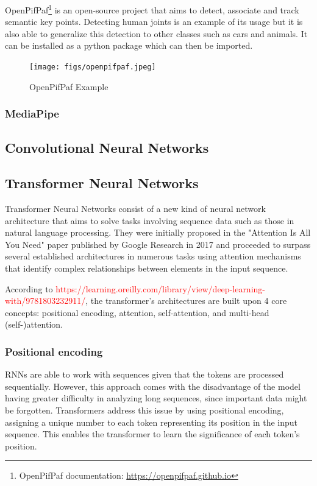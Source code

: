 OpenPifPaf\cite{Kreiss2021,Kreiss2019}\footnote{OpenPifPaf documentation: \url{https://openpifpaf.github.io}} is an open-source project that aims to detect, associate and track semantic key points. Detecting human joints is an example of its usage but it is also able to generalize this detection to other classes such as cars and animals. It can be installed as a python package which can then be imported.

\begin{figure}[h]
\centerline{\texttt{[image: figs/openpifpaf.jpeg]}}
\caption[OpenPifPaf Example]{OpenPifPaf Example \cite{Kreiss2021}}
\label{openpifpaf}
\end{figure}

\subsubsection{MediaPipe}

\subsection{Convolutional Neural Networks}

\subsection{Transformer Neural Networks}
\label{subsection:transformer_neural_networks}

Transformer Neural Networks consist of a new kind of neural network architecture that aims to solve tasks involving sequence data such as those in natural language processing. They were initially proposed in the "Attention Is All You Need" paper published by Google Research in 2017\cite{Vaswani2017} and proceeded to surpass several established architectures in numerous tasks using attention mechanisms that identify complex relationships between elements in the input sequence.

According to \textcolor{red}{https://learning.oreilly.com/library/view/deep-learning-with/9781803232911/}, the transformer's architectures are built upon 4 core concepts: positional encoding, attention, self-attention, and multi-head (self-)attention.

\subsubsection{Positional encoding}

RNNs are able to work with sequences given that the tokens are processed sequentially. However, this approach comes with the disadvantage of the model having greater difficulty in analyzing long sequences, since important data might be forgotten. Transformers address this issue by using positional encoding, assigning a unique number to each token representing its position in the input sequence. This enables the transformer to learn the significance of each token's position.

